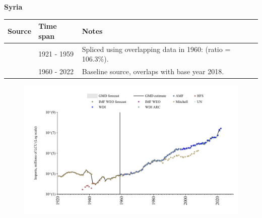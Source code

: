\documentclass[12pt,a4paper,landscape]{article}
\begin{document}
\begin{adjustbox}{max totalsize={\paperwidth}{\paperheight},center}
\begin{minipage}[t][\textheight][t]{\textwidth}
\vspace*{0.5cm}
{}
\begin{center}
{\Large\bfseries Syria}
\end{center}
\vspace{0.5cm}
\begin{table}[H]
\centering
\small
\begin{tabular}{|l|l|l|}
\hline
\textbf{Source} & \textbf{Time span} & \textbf{Notes} \\
\hline
\rowcolor{white}\cite{Mitchell}& 1921 - 1959 &Spliced using overlapping data in 1960: (ratio = 106.3\%).\\
\rowcolor{lightgray}\cite{WDI}& 1960 - 2022 &Baseline source, overlaps with base year 2018.\\
\hline
\end{tabular}
\end{table}
\begin{figure}[H]
\centering
\includegraphics[width=\textwidth,height=0.6\textheight,keepaspectratio]{graphs/SYR_imports.pdf}
\end{figure}
\end{minipage}
\end{adjustbox}
\end{document}
